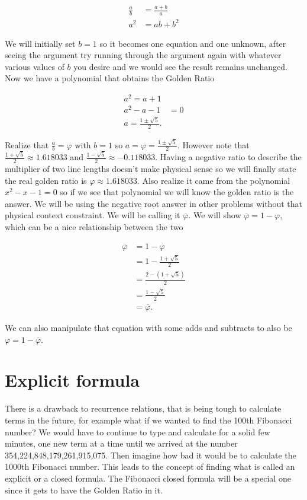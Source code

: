 \documentclass{article}
\begin{document}
\begin{align*}
    \frac{a}{b}&=\frac{a+b}{a} \\
    a^2&=ab+b^2 
\end{align*}

We will initially set $b=1$ so it becomes one equation and one unknown, after seeing the argument try running through the argument again with whatever various values of $b$ you desire and we would see the result remains unchanged. Now we have a polynomial that obtains the Golden Ratio

\begin{align*}
    a^2=a+1& \\
    a^2-a-1&=0 \\
    a=\frac{1 \pm \sqrt{5}}{2}.
\end{align*}

Realize that $\frac{a}{b}=\varphi$ with $b=1$ so $a=\varphi=\frac{1 \pm \sqrt{5}}{2}$. However note that $\frac{1+\sqrt{5}}{2}\approx 1.618033$ and $\frac{1-\sqrt{5}}{2}\approx -0.118033$. Having a negative ratio to describe the multiplier of two line lengths doesn't make physical sense so we will finally state the real golden ratio is $\varphi \approx 1.618033$. Also realize it came from the polynomial $x^2-x-1=0$ so if we see that polynomial we will know the golden ratio is the answer. We will be using the negative root answer in other problems without that physical context constraint. We will be calling it $\overline{\varphi}$. We will show $\overline{\varphi}=1-\varphi$, which can be a nice relationship between the two

\begin{align*}
    \overline{\varphi} &= 1-\varphi \\
     &= 1-\frac{1+\sqrt{5}}{2} \\
     &= \frac{2-(1+\sqrt{5})}{2} \\
     &= \frac{1 - \sqrt{5}}{2} \\
     &= \overline{\varphi}.
\end{align*}

We can also manipulate that equation with some adds and subtracts to also be $\varphi=1-\overline{\varphi}$.

\section{Explicit formula}

There is a drawback to recurrence relations, that is being tough to calculate terms in the future, for example what if we wanted to find the 100th Fibonacci number? We would have to continue to type and calculate for a solid few minutes, one new term at a time until we arrived at the number 354,224,848,179,261,915,075. Then imagine how bad it would be to calculate the 1000th Fibonacci number. This leads to the concept of finding what is called an explicit or a closed formula. The Fibonacci closed formula will be a special one since it gets to have the Golden Ratio in it. \\
\end{document}
